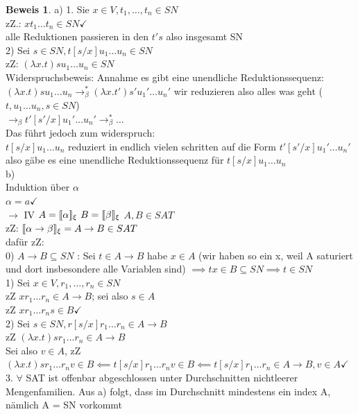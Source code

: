 \documentclass{article}
\theoremstyle{definition}
\newtheorem{beweis}{Beweis}[section]
\begin{document}
	\begin{beweis} a) 1. Sie $x\in V,t_1,\dots,t_n\in SN$\\
	zZ.: $xt_1\dots t_n\in SN\checkmark$\\
	alle Reduktionen passieren in den $t's$ also insgesamt SN\\
	2) Sei $s\in SN, t[s/x]u_1\dots u_n\in SN$\\
	zZ: $(\lambda x.t)su_1\dots u_n\in SN$\\
	Widerspruchsbeweis: Annahme es gibt eine unendliche Reduktionssequenz:\\
	$(\lambda x.t)su_1\dots u_n\to_\beta^* (\lambda x.t')s'u_1'\dots u_n'$ wir reduzieren also alles was geht ($t,u_1\dots u_n,s\in SN$)\\
	$\to_\beta t'[s'/x]u_1'\dots u_n'\to_\beta^*\dots$\\
	Das führt jedoch zum widerspruch:\\
	$t[s/x]u_1\dots u_n$ reduziert in endlich vielen schritten auf die Form $t'[s'/x]u_1'\dots u_n'$ also gäbe es eine unendliche Reduktionssequenz für $t[s/x]u_1\dots u_n$\\
	b)\\
	Induktion über $\alpha$\\
	$\alpha = a\checkmark$\\
	$\to$ IV $A=\llbracket \alpha\rrbracket_\xi$ $B=\llbracket \beta\rrbracket_\xi$ $A,B\in SAT$\\
	zZ: $\llbracket \alpha\to\beta\rrbracket_\xi = A\to B\in SAT$\\
	dafür zZ:\\
	0) $A\to B\subseteq SN$ : Sei $t\in A\to B$ habe $x\in A$ (wir haben so ein x, weil A saturiert und dort insbesondere alle Variablen sind) $\implies tx\in B\subseteq SN\implies t\in SN$\\
	1) Sei $x\in V, r_1,\dots, r_n\in SN$\\
	zZ $xr_1\dots r_n\in A\to B$; sei also $s\in A$\\
	zZ $xr_1\dots r_n s\in B\checkmark$ \\
	2) Sei $s\in SN, r[s/x]r_1\dots r_n\in A\to B$\\
	zZ $(\lambda x.t)sr_1\dots r_n\in A\to B$\\
	Sei also $v\in A$, zZ $(\lambda x.t)sr_1\dots r_n v\in B\impliedby t[s/x]r_1\dots r_nv\in B\impliedby t[s/x]r_1\dots r_n\in  A\to B, v\in A\checkmark$\\
	3. $\forall$ SAT ist offenbar abgeschlossen unter Durchschnitten nichtleerer Mengenfamilien. Aus a) folgt, dass im Durchschnitt mindestens ein index A, nämlich A = SN vorkommt
	\end{beweis}
\end{document}
